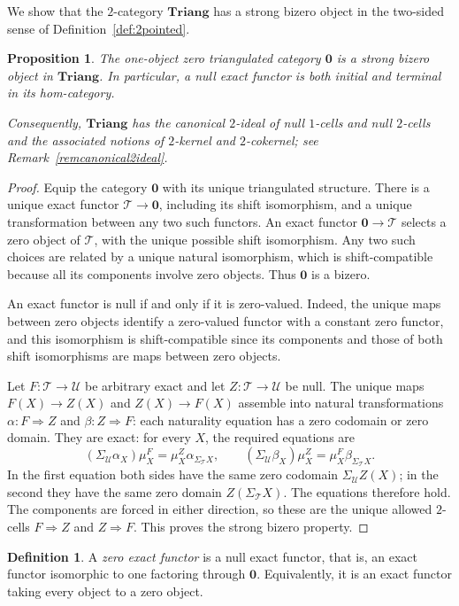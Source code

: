 \documentclass[11pt,reqno,a4paper]{amsart}
\newtheorem{proposition}[theorem]{Proposition}
\theoremstyle{definition}
\newtheorem{definition}[theorem]{Definition}
\theoremstyle{remark}
\def\dfn#1{{\itshape #1}}
\newcommand{\T}{\mathcal{T}}
\newcommand{\U}{\mathcal{U}}
\newcommand{\0}{\mathbf{0}}
\renewcommand{\1}{\mathbf{1}}
\newcommand{\Triang}{\mathbf{Triang}}
\begin{document}
We show that the $2$-category $\Triang$ has a strong bizero object
in the two-sided sense of Definition~\ref{def:2pointed}.

\begin{proposition}\label{prop:tri-strongzero}
The one-object zero triangulated category $\0$ is a strong bizero
object in $\Triang$. In particular, a null exact functor is both
initial and terminal in its hom-category.

Consequently, $\Triang$ has the canonical $2$-ideal of null
$1$-cells and null $2$-cells and the associated notions of
$2$-kernel and $2$-cokernel; see Remark~\ref{remcanonical2ideal}.
\end{proposition}
\begin{proof}
Equip the category $\0$ with its unique triangulated structure.
There is a unique exact functor $\T\to\0$, including its shift
isomorphism, and a unique transformation between any two such
functors. An exact functor $\0\to\T$ selects a zero object of
$\T$, with the unique possible shift isomorphism. Any two such
choices are related by a unique natural isomorphism, which is
shift-compatible because all its components involve zero objects.
Thus $\0$ is a bizero.

An exact functor is null if and only if it is zero-valued. Indeed,
the unique maps between zero objects identify a zero-valued functor
with a constant zero functor, and this isomorphism is shift-compatible
since its components and those of both shift isomorphisms are maps
between zero objects.

Let $F:\T\to\U$ be arbitrary exact and let $Z:\T\to\U$ be
null. The unique maps $F(X)\to Z(X)$ and $Z(X)\to F(X)$ assemble
into natural transformations $\alpha:F\Rightarrow Z$ and
$\beta:Z\Rightarrow F$: each naturality equation has a zero
codomain or zero domain. They are exact:
for every $X$, the required equations are
\[
 (\Sigma_{\U}\alpha_X)\mu^F_X
   =\mu^Z_X\alpha_{\Sigma_{\T}X},
 \qquad
 (\Sigma_{\U}\beta_X)\mu^Z_X
   =\mu^F_X\beta_{\Sigma_{\T}X}.
\]
In the first equation both sides have the same zero codomain
$\Sigma_{\U}Z(X)$; in the second they have the same zero domain
$Z(\Sigma_{\T}X)$. The equations therefore hold. The components
are forced in either direction, so these are the unique allowed
$2$-cells $F\Rightarrow Z$ and $Z\Rightarrow F$. This proves the
strong bizero property.
\end{proof}

\begin{definition}
A \dfn{zero exact functor} is a null exact functor, that is, an exact
functor isomorphic to one factoring through $\0$. Equivalently, it
is an exact functor taking every object to a zero object.
\end{definition}
\end{document}
